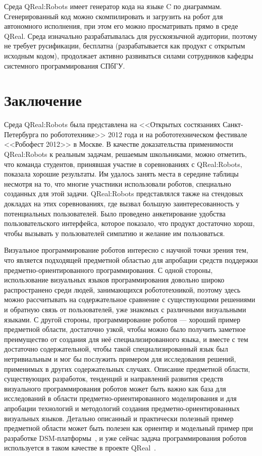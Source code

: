 \documentclass[a4paper]{article}
\begin{document}
Среда QReal:Robots имеет генератор кода на языке C по диаграммам. Сгенерированный код можно скомпилировать и загрузить на робот для автономного исполнения, при этом его можно просматривать прямо в среде QReal. Среда изначально разрабатывалась для русскоязычной аудитории, поэтому не требует русификации, бесплатна (разрабатывается как продукт с открытым исходным кодом), продолжает активно развиваться силами сотрудников кафедры системного программирования СПбГУ.

\section*{Заключение}

Среда QReal:Robots была представлена на <<Открытых состязаниях Санкт-Петербурга по робототехнике>> 2012 года и на робототехническом фестивале <<Робофест 2012>> в Москве. В качестве доказательства применимости QReal:Robots к реальным задачам, решаемым школьниками, можно отметить, что команда студентов, принявшая  участие в соревнованиях с QReal:Robots, показала хорошие результаты. Им удалось занять места в середине таблицы несмотря на то, что многие участники использовали роботов, специально созданных для этой задачи. QReal:Robots представлялся также на стендовых докладах на этих соревнованиях, где вызвал большую заинтересованность у потенциальных пользователей. Было проведено анкетирование удобства пользовательского интерфейса, которое показало, что продукт достаточно хорош, чтобы вызывать у пользователей симпатию и желание им пользоваться.

Визуальное программирование роботов интересно с научной точки зрения тем, что является подходящей предметной областью для апробации средств поддержки предметно-ориентированного программирования. С одной стороны, использование визуальных языков программирования довольно широко распространено среди людей, занимающихся робототехникой, поэтому здесь можно рассчитывать на содержательное сравнение с существующими решениями и обратную связь от пользователей, уже знакомых с различными визуальными языками. С другой стороны, программирование роботов --- хороший пример предметной области, достаточно узкой, чтобы можно было получить заметное преимущество от создания для неё специализированного языка, и вместе с тем достаточно содержательной, чтобы такой специализированный язык был нетривиальным и мог бы послужить примером для исследования решений, применимых в других содержательных случаях. Описание предметной области, существующих разработок, тенденций и направлений развития средств визуального программирования роботов может быть важно как база для исследований в области предметно-ориентированного моделирования и для апробации технологий и методологий создания предметно-ориентированных визуальных языков. Детально описанный и практически полезный пример предметной области может быть полезен как ориентир и модельный пример при разработке DSM-платформы~\cite{dsmPlatforms}, и уже сейчас задача программирования роботов используется в таком качестве в проекте QReal~\cite{qReal}.
\end{document}

